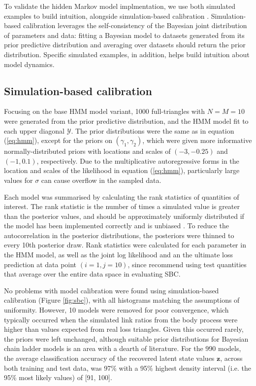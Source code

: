 To validate the hidden Markov model implmentation, 
we use both simulated examples
to build intuition, alongside
simulation-based calibration \citep{talts2018,modrak2023}.
Simulation-based calibration leverages the self-consistency
of the Bayesian joint distribution of parameters and
data: fitting a Bayesian model to datasets generated
from its prior predictive distribution and averaging 
over datasets should return the prior distribution.
Specific simulated examples, in addition, helps
build intuition about model dynamics.

\subsection{Simulation-based calibration}
Focusing on the base HMM model variant, 1000 
full-triangles with $N = M = 10$ were generated
from the prior predictive distribution, and the
HMM model fit to each upper diagonal $\mathcal{Y}$.
The prior distributions were the same as in
equation (\ref{eq:hmm}), except for the priors
on $(\gamma_{1}, \gamma_{2})$, which were 
given more informative normally-distributed priors
with locations and scales of $(-3, -0.25)$ and
$(-1, 0.1)$, respectively. Due to the
multiplicative autoregressive forms in the
location and scales of the likelihood in
equation (\ref{eq:hmm}), particularly
large values for $\sigma$ can cause overflow
in the sampled data.

Each model was summarised by
calculating the rank statistics of quantities
of interest.
The rank statistic is the number of times a
simulated value is greater than the posterior values,
and should be approximately uniformly distributed
if the model has been implemented correctly and is
unbiased \citep{talts2018}. To reduce the autocorrelation
in the posterior distributions, the posteriors were
thinned to every 10th posterior draw.
Rank statistics
were calculated for each parameter in the HMM model,
as well as the joint log likelihood and
an the ultimate loss prediction at data point
$(i=1, j=10)$, since \cite{modrak2023} recommend
using test quantities that average over the entire
data space in evaluating SBC.

No problems with model calibration were found using simulation-based
calibration (Figure \ref{fig:sbc}),
with all histograms matching the assumptions of
uniformity. However, 10 models were removed for poor
convergence, which typically occurred when the simulated
link ratios from the body process were
higher than values expected from real loss triangles. 
Given this occurred rarely, the priors were left
unchanged, although suitable prior distributions
for Bayesian chain ladder models is an area
with a dearth of literature.
For the 990 models, 
the average classification accuracy of the recovered latent
state values $\bm{z}$, across
both training and test data, was 97\% with a 
95\% highest density interval (i.e. the 95\% most
likely values) of [91, 100].

